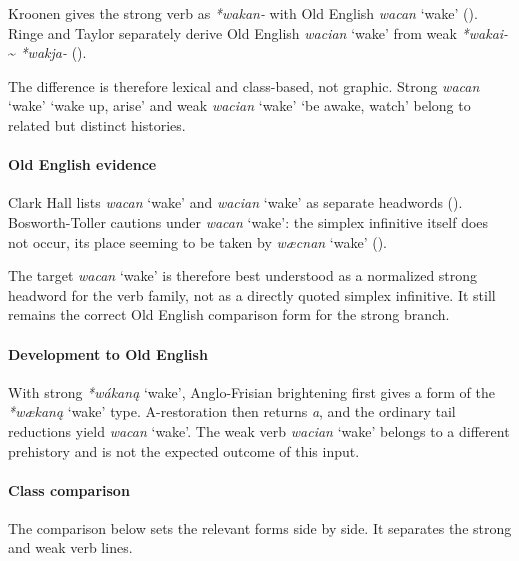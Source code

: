 \documentclass[
  british,
  a4paper,
]{article}
\providecommand{\Recon}[1]{\emph{*#1}}
\begin{document}
Kroonen gives the strong verb as \emph{*wakan-} with Old English
{\emph{wacan}} `wake' ().
Ringe and Taylor separately derive Old English {\emph{wacian}} `wake'
from weak \emph{*wakai-} \textasciitilde{} \emph{*wakja-}
().

The difference is therefore lexical and class-based, not graphic. Strong
{\emph{wacan}} `wake' `wake up, arise' and weak {\emph{wacian}} `wake'
`be awake, watch' belong to related but distinct histories.

\paragraph{Old English evidence}\label{old-english-evidence-120}

Clark Hall lists {\emph{wacan}} `wake' and {\emph{wacian}} `wake' as
separate headwords ().
Bosworth-Toller cautions under {\emph{wacan}} `wake': the simplex
infinitive itself does not occur, its place seeming to be taken by
{\emph{wæcnan}} `wake' ().

The target {\emph{wacan}} `wake' is therefore best understood as a
normalized strong headword for the verb family, not as a directly quoted
simplex infinitive. It still remains the correct Old English comparison
form for the strong branch.

\paragraph{Development to Old
English}\label{development-to-old-english-118}

With strong \Recon{wákaną} `wake', Anglo-Frisian brightening first gives
a form of the \Recon{wækaną} `wake' type. A-restoration then returns
\emph{a}, and the ordinary tail reductions yield {\emph{wacan}} `wake'.
The weak verb {\emph{wacian}} `wake' belongs to a different prehistory
and is not the expected outcome of this input.

\paragraph{Class comparison}\label{class-comparison-4}

The comparison below sets the relevant forms side by side. It separates
the strong and weak verb lines.
\end{document}
